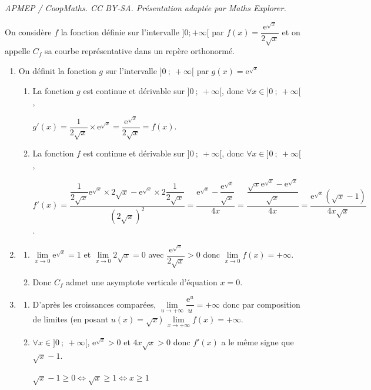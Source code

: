 \documentclass[10pt]{article}
\providecommand{\e}{{\mathrm{e}}}
\providecommand{\ds}{\displaystyle}
\begin{document}
\noindent\textit{APMEP / CoopMaths. CC BY-SA. Présentation adaptée par Maths Explorer.}\par\medskip
\medskip

On considère $f$ la fonction définie sur l'intervalle $]0; +\infty[$ par $f(x) = \dfrac{\e^{\sqrt{x}}}{2 \sqrt{x}}$ et on appelle $C_f$ sa courbe représentative dans un repère orthonormé.

\begin{enumerate}
\item On définit la fonction $g$ sur l'intervalle $]0~;~ +\infty[$ par $g(x) = \e^{\sqrt{x}}$
	\begin{enumerate}
		\item La fonction $g$ est continue et dérivable sur $]0~;~+\infty[$, donc $\forall x \in ]0~;~+\infty[$,

$g'(x) = \dfrac{1}{2\sqrt{x}}\times \e^{\sqrt{x}}= \dfrac{\e^{\sqrt{x}}}{2\sqrt{x}} = f(x)$.
		\item La fonction $f$ est continue et dérivable sur $]0~;~+\infty[$, donc $\forall x \in ]0~;~+\infty[$,
	
$f'(x) = \dfrac{\dfrac{1}{2\sqrt{x}}\e^{\sqrt{x}}\times2\sqrt{x}-\e^{\sqrt{x}}\times 2\dfrac{1}{2\sqrt{x}}}{(2\sqrt{x})^2} = \dfrac{\e^{\sqrt{x}}-\dfrac{\e^{\sqrt{x}}}{\sqrt{x}}}{4x}=\dfrac{\dfrac{\sqrt{x}\e^{\sqrt{x}}-\e^{\sqrt{x}}}{\sqrt{x}}}{4x}= \dfrac{\e^{\sqrt{x}} (\sqrt{x} - 1)}{4 x \sqrt{x}}$.
	\end{enumerate}
	\item 
	\begin{enumerate}
		\item $\ds \lim\limits_{x \to 0} \e^{\sqrt{x}}=1$ et $\ds \lim\limits_{x \to 0} 2\sqrt{x}=0$ avec $\dfrac{\e^{\sqrt{x}}}{2 \sqrt{x}} > 0$ donc $\ds \lim\limits_{x \to 0}f(x)=+\infty$.
		\item Donc $C_f$ admet une asymptote verticale d'équation $x=0$.
	\end{enumerate}
	\item 
	\begin{enumerate}
		\item D'après les croissances comparées, $\ds \lim\limits_{u \to +\infty} \dfrac{\e^u}{u}=+\infty$ donc par composition de limites (en posant $u(x)=\sqrt{x}$) $\lim\limits_{x \to +\infty} f(x)=+\infty$.
		\item $\forall x \in ]0~;~+\infty[$, $\e^{\sqrt{x}}>0$ et $4 x \sqrt{x}>0$ donc $f'(x)$ a le même signe que $\sqrt{x}-1$.

$\sqrt{x}-1\geqslant 0 \iff \sqrt{x}\geqslant1 \iff x\geqslant1$


\end{enumerate}
\end{enumerate}
\end{document}
